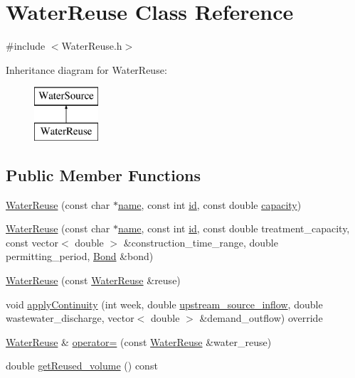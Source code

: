 \hypertarget{classWaterReuse}{}\section{Water\+Reuse Class Reference}
\label{classWaterReuse}


{\ttfamily \#include $<$Water\+Reuse.\+h$>$}

Inheritance diagram for Water\+Reuse\+:\begin{figure}[H]
\begin{center}
\leavevmode
\includegraphics[height=2.000000cm]{classWaterReuse}
\end{center}
\end{figure}
\subsection*{Public Member Functions}
\begin{DoxyCompactItemize}
\item 
\mbox{\hyperlink{classWaterReuse_a0493da65856f50fad2bc2d2c087f378f}{Water\+Reuse}} (const char $\ast$\mbox{\hyperlink{classWaterSource_a846ea74c5b453d014f594d41fee8c765}{name}}, const int \mbox{\hyperlink{classWaterSource_a6eafe5dfefd317877d1244e8a7c6e742}{id}}, const double \mbox{\hyperlink{classWaterSource_a2ec257b415b248214a8bce7fc5267723}{capacity}})
\item 
\mbox{\hyperlink{classWaterReuse_a107ecd54d6fd705f0c31e57de21914e1}{Water\+Reuse}} (const char $\ast$\mbox{\hyperlink{classWaterSource_a846ea74c5b453d014f594d41fee8c765}{name}}, const int \mbox{\hyperlink{classWaterSource_a6eafe5dfefd317877d1244e8a7c6e742}{id}}, const double treatment\+\_\+capacity, const vector$<$ double $>$ \&construction\+\_\+time\+\_\+range, double permitting\+\_\+period, \mbox{\hyperlink{classBond}{Bond}} \&bond)
\item 
\mbox{\hyperlink{classWaterReuse_abe522bfe68c8b0bd05c4e608f3f6e6ba}{Water\+Reuse}} (const \mbox{\hyperlink{classWaterReuse}{Water\+Reuse}} \&reuse)
\item 
void \mbox{\hyperlink{classWaterReuse_ab8ffb10c69790047a3a5dda66cfaf3ee}{apply\+Continuity}} (int week, double \mbox{\hyperlink{classWaterSource_a7a69b2e9b6030f1035e6cf44d2918ee5}{upstream\+\_\+source\+\_\+inflow}}, double wastewater\+\_\+discharge, vector$<$ double $>$ \&demand\+\_\+outflow) override
\item 
\mbox{\hyperlink{classWaterReuse}{Water\+Reuse}} \& \mbox{\hyperlink{classWaterReuse_a8bf201adfc25021511d8844cd056d5bf}{operator=}} (const \mbox{\hyperlink{classWaterReuse}{Water\+Reuse}} \&water\+\_\+reuse)
\item 
double \mbox{\hyperlink{classWaterReuse_a78c905f77ca46fbbb2251f9cfa9a04de}{get\+Reused\+\_\+volume}} () const
\end{DoxyCompactItemize}
